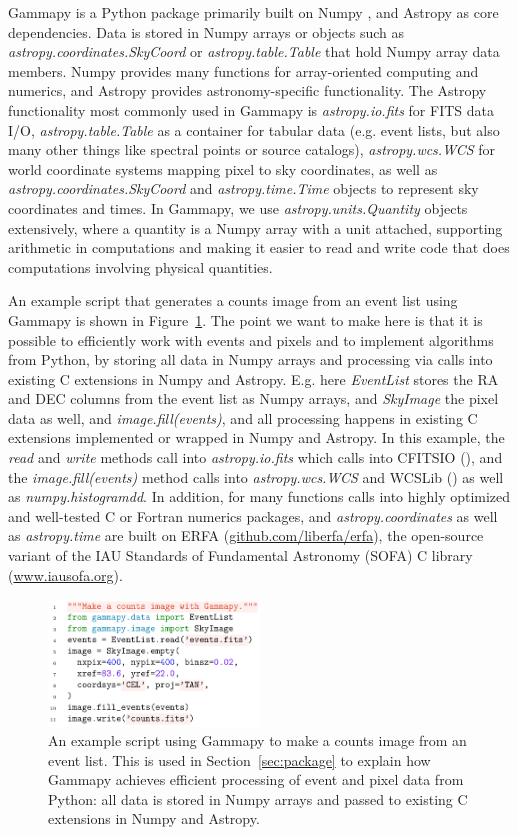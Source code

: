 \documentclass{PoS}
\newcommand{\urlErfa}{\href{https://github.com/liberfa/erfa}{github.com/liberfa/erfa}}
\newcommand{\urlSofa}{\href{http://www.iausofa.org}{www.iausofa.org}}
\begin{document}
Gammapy is a Python package primarily built on Numpy \cite{numpy}, and Astropy
\cite{astropy} as core dependencies. Data is stored in Numpy arrays or objects
such as {\it astropy.coordinates.SkyCoord} or {\it astropy.table.Table} that
hold Numpy array data members. Numpy provides many functions for array-oriented
computing and numerics, and Astropy provides astronomy-specific functionality.
The Astropy functionality most commonly used in Gammapy is {\it astropy.io.fits}
for FITS data I/O, {\it astropy.table.Table} as a container for tabular data
(e.g. event lists, but also many other things like spectral points or source
catalogs), {\it astropy.wcs.WCS} for world coordinate systems mapping pixel to
sky coordinates, as well as {\it astropy.coordinates.SkyCoord} and {\it
astropy.time.Time} objects to represent sky coordinates and times. In Gammapy,
we use {\it astropy.units.Quantity} objects extensively, where a quantity is a
Numpy array with a unit attached, supporting arithmetic in computations and
making it easier to read and write code that does computations involving
physical quantities.

An example script that generates a counts image from an event list using Gammapy
is shown in Figure~\ref{fig:code_example}. The point we want to make here is
that it is possible to efficiently work with events and pixels and to implement
algorithms from Python, by storing all data in Numpy arrays and processing via
calls into existing C extensions in Numpy and Astropy. E.g. here {\it EventList}
stores the RA and DEC columns from the event list as Numpy arrays, and {\it
SkyImage} the pixel data as well, and {\it image.fill(events)}, and all
processing happens in existing C extensions implemented or wrapped in Numpy and
Astropy. In this example, the {\it read} and {\it write} methods call into {\it
astropy.io.fits} which calls into CFITSIO (\cite{cfitsio}), and the {\it
image.fill(events)} method calls into {\it astropy.wcs.WCS} and WCSLib
(\cite{wcslib}) as well as {\it numpy.histogramdd}. In addition, for many
functions calls into highly optimized and well-tested C or Fortran numerics
packages, and {\it astropy.coordinates} as well as {\it astropy.time} are built
on ERFA (\urlErfa), the open-source variant of the IAU Standards of Fundamental
Astronomy (SOFA) C library (\urlSofa).

\begin{figure}[t]
\centering
\includegraphics[width=0.5\textwidth]{examples/code_events_image}
\caption{
An example script using Gammapy to make a counts image from an event list. This
is used in Section~\ref{sec:package} to explain how Gammapy achieves efficient
processing of event and pixel data from Python: all data is stored in Numpy
arrays and passed to existing C extensions in Numpy and Astropy.
}
\label{fig:code_example}
\end{figure}
\end{document}
